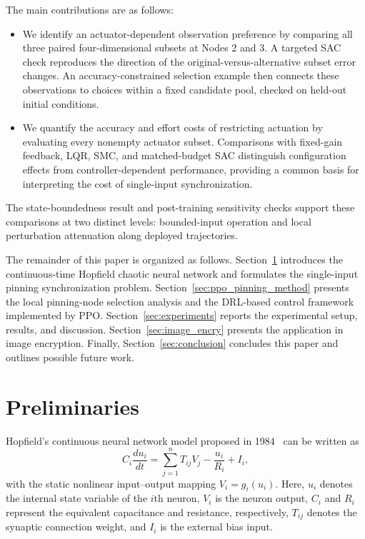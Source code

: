 \documentclass[a4paper,fleqn]{cas-dc}
\theoremstyle{plain}
\theoremstyle{definition}
\begin{document}
The main contributions are as follows:
\begin{itemize}
\item We identify an actuator-dependent observation preference by comparing all three paired four-dimensional subsets at Nodes 2 and 3. A targeted SAC check reproduces the direction of the original-versus-alternative subset error changes. An accuracy-constrained selection example then connects these observations to choices within a fixed candidate pool, checked on held-out initial conditions.
\item We quantify the accuracy and effort costs of restricting actuation by evaluating every nonempty actuator subset. Comparisons with fixed-gain feedback, LQR, SMC, and matched-budget SAC distinguish configuration effects from controller-dependent performance, providing a common basis for interpreting the cost of single-input synchronization.
\end{itemize}

The state-boundedness result and post-training sensitivity checks support these comparisons at two distinct levels: bounded-input operation and local perturbation attenuation along deployed trajectories.

The remainder of this paper is organized as follows. Section~\ref{sec:preliminaries} introduces the continuous-time Hopfield chaotic neural network and formulates the single-input pinning synchronization problem. Section~\ref{sec:ppo_pinning_method} presents the local pinning-node selection analysis and the DRL-based control framework implemented by PPO. Section~\ref{sec:experiments} reports the experimental setup, results, and discussion. Section~\ref{sec:image_encry} presents the application in image encryption. Finally, Section~\ref{sec:conclusion} concludes this paper and outlines possible future work.

\section{Preliminaries}
\label{sec:preliminaries}
Hopfield's continuous neural network model proposed in 1984~\cite{hopfield1984neurons} can be written as
\begin{equation}
	C_i \frac{du_i}{dt} = \sum_{j=1}^{n} T_{ij} V_j - \frac{u_i}{R_i} + I_i,
	\label{eq:hopfield_original_1}
\end{equation}
with the static nonlinear input--output mapping $V_i = g_i(u_i)$. Here, $u_i$ denotes the internal state variable of the $i$th neuron, $V_i$ is the neuron output, $C_i$ and $R_i$ represent the equivalent capacitance and resistance, respectively, $T_{ij}$ denotes the synaptic connection weight, and $I_i$ is the external bias input.
\end{document}
